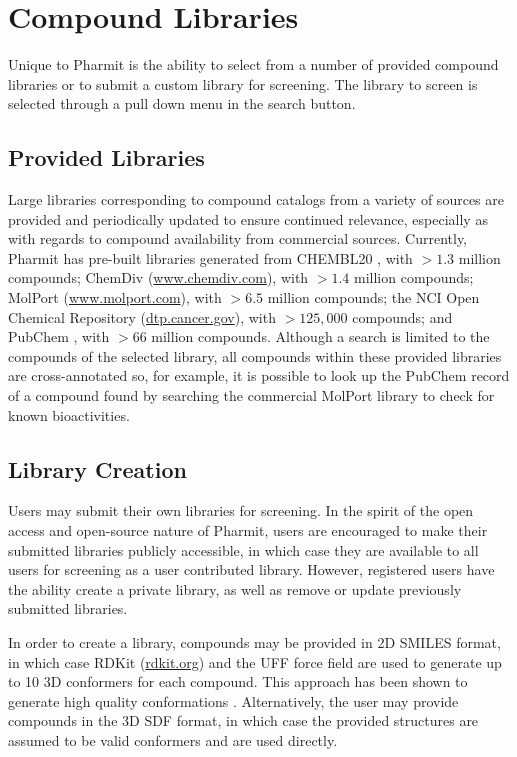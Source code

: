 \section{Compound Libraries}

Unique to Pharmit is the ability to select from a number of provided compound libraries or to submit a custom library for screening.  The library to screen is selected through a pull down menu in the search button.  

\subsection{Provided Libraries}

Large libraries corresponding to compound catalogs from a variety of sources are provided and periodically updated to ensure continued relevance, especially as with regards to compound availability from commercial sources.  Currently, Pharmit has pre-built libraries generated from CHEMBL20 \cite{Gaulton_2011}, with $>1.3$ million compounds; ChemDiv (\url{www.chemdiv.com}), with $>1.4$ million compounds; MolPort (\url{www.molport.com}), with $>6.5$ million compounds; the NCI Open Chemical Repository (\url{dtp.cancer.gov}), with $>125,000$ compounds; and PubChem \cite{Kim_2015}, with $>66$ million compounds. 
 Although a search is limited to the compounds of the selected library, all compounds within these provided libraries are cross-annotated so, for example, it is possible to look up the PubChem record of a compound found by searching the commercial MolPort library to check for known bioactivities.


\subsection{Library Creation}

Users may submit their own libraries for screening.  In the spirit of the open access and open-source nature of Pharmit, users are encouraged to make their submitted libraries publicly accessible, in which case they are available to all users for screening as a user contributed library.  However, registered users have the ability create a private library, as well as remove or update previously submitted libraries. 

In order to create a library, compounds may be provided in 2D SMILES format, in which case RDKit (\url{rdkit.org}) and the UFF force field \cite{Rappe_1992} are used to generate up to 10 3D conformers for each compound.  This approach has been shown to generate high quality conformations \cite{Ebejer_2012}.  Alternatively, the user may provide compounds in the 3D SDF format, in which case the provided structures are assumed to be valid conformers and are used directly.
